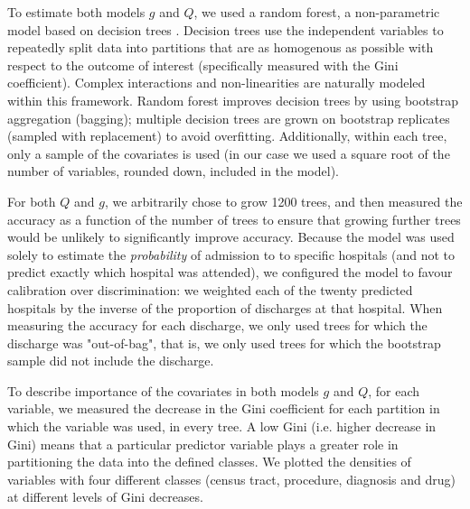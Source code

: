 \documentclass[]{article}\usepackage[]{graphicx}\usepackage[]{color}
\begin{document}
To estimate both models $g$ and $Q$, we used a random forest, a non-parametric model based on decision trees \supercite{breiman_random_2001}. Decision trees use the independent variables to repeatedly split data into partitions that are as homogenous as possible with respect to the outcome of interest (specifically measured with the Gini coefficient\supercite{gini_variabilita_1912}). Complex interactions and non-linearities are naturally modeled within this framework. Random forest improves decision trees by using bootstrap aggregation (bagging); multiple decision trees are grown on bootstrap replicates (sampled with replacement) to avoid overfitting. Additionally, within each tree, only a sample of the covariates is used (in our case we used a square root of the number of variables, rounded down, included in the model).

For both $Q$ and $g$, we arbitrarily chose to grow 1200 trees, and then measured the accuracy as a function of the number of trees to ensure that growing further trees would be unlikely to significantly improve accuracy. Because the model was used solely to estimate the \emph{probability} of admission to to specific hospitals (and not to predict exactly which hospital was attended), we configured the model to favour calibration over discrimination: we weighted each of the twenty predicted hospitals by the inverse of the proportion of discharges at that hospital. When measuring the accuracy for each discharge, we only used trees for which the discharge was "out-of-bag", that is, we only used trees for which the bootstrap sample did not include the discharge.

To describe importance of the covariates in both models $g$ and $Q$, for each variable, we measured the decrease in the Gini coefficient for each partition in which the variable was used, in every tree. A low Gini (i.e. higher decrease in Gini) means that a particular predictor variable plays a greater role in partitioning the data into the defined classes. We plotted the densities of variables with four different classes (census tract, procedure, diagnosis and drug) at different levels of Gini decreases.
\end{document}
